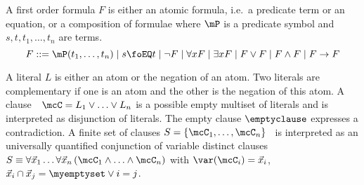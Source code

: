 %
\begin{definition}\label{def:first-order}
A {\myem first order formula} $F$ is either an 
{\myem atomic formula}, i.e.~a predicate term or an equation, or a composition of formulae where $\mP$ is a predicate symbol and $s,t,t_1,\ldots,t_n$ are terms.
%
\[
 F ::= \mP(t_1,\ldots,t_n) \mid
	s \foEQ t \mid
	\lnot F \mid 
	\forall x F \mid
	\exists x F \mid
	 F\lor F \mid
	 F\land F \mid
	 F\rightarrow F
\]
\end{definition}
\begin{definition}\label{def:literals}
A {\myem literal} $L$ is either an atom
or the negation of an atom.
Two literals are complementary if one is an atom and the other is the negation of this atom.
%
A {\myem clause}\ \ $\mcC = L_1\lor\ldots\lor L_n$  is a possible empty multiset of literals and is interpreted as disjunction of literals.
The {\myem empty clause} $\emptyclause$ expresses a contradiction. 
A finite {\myem set of clauses} $S=\{ \mcC_1,\ldots,\mcC_n \}$ 
is interpreted as an universally quantified conjunction of variable distinct clauses
$S\equiv\forall\vec{x}_1\ldots\forall\vec{x}_n\left(\mcC_1\land\ldots\land\mcC_n\right)$ with 
$\var(\mcC_i)=\vec{x}_i$, 
$\vec{x}_i\cap\vec{x}_j=\myemptyset\lor i=j$.
\end{definition}

